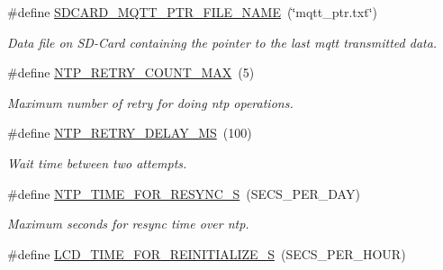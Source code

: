 \begin{DoxyCompactItemize}
\mbox{\label{rmap-config_8h_a7470ca0f869e88a49d4d70bad5de69e6}} 
\#define \hyperlink{rmap-config_8h_a7470ca0f869e88a49d4d70bad5de69e6}{S\+D\+C\+A\+R\+D\+\_\+\+M\+Q\+T\+T\+\_\+\+P\+T\+R\+\_\+\+F\+I\+L\+E\+\_\+\+N\+A\+ME}~(\char`\"{}mqtt\+\_\+ptr.\+txt\char`\"{})
\begin{DoxyCompactList}\small\item\em Data file on S\+D-\/\+Card containing the pointer to the last mqtt transmitted data. \end{DoxyCompactList}\item 
\mbox{\label{rmap-config_8h_a5042473c874b6f184bd4dc197feadca9}} 
\#define \hyperlink{rmap-config_8h_a5042473c874b6f184bd4dc197feadca9}{N\+T\+P\+\_\+\+R\+E\+T\+R\+Y\+\_\+\+C\+O\+U\+N\+T\+\_\+\+M\+AX}~(5)
\begin{DoxyCompactList}\small\item\em Maximum number of retry for doing ntp operations. \end{DoxyCompactList}\item 
\mbox{\label{rmap-config_8h_aee0934e91270bda3cc3fcaa9082fadc8}} 
\#define \hyperlink{rmap-config_8h_aee0934e91270bda3cc3fcaa9082fadc8}{N\+T\+P\+\_\+\+R\+E\+T\+R\+Y\+\_\+\+D\+E\+L\+A\+Y\+\_\+\+MS}~(100)
\begin{DoxyCompactList}\small\item\em Wait time between two attempts. \end{DoxyCompactList}\item 
\mbox{\label{rmap-config_8h_ac26c9e27fc41a5f7c43968b47b2d8cfc}} 
\#define \hyperlink{rmap-config_8h_ac26c9e27fc41a5f7c43968b47b2d8cfc}{N\+T\+P\+\_\+\+T\+I\+M\+E\+\_\+\+F\+O\+R\+\_\+\+R\+E\+S\+Y\+N\+C\+\_\+S}~(S\+E\+C\+S\+\_\+\+P\+E\+R\+\_\+\+D\+AY)
\begin{DoxyCompactList}\small\item\em Maximum seconds for resync time over ntp. \end{DoxyCompactList}\item 
\mbox{\label{rmap-config_8h_af546d356bff5c682bba4aeeed199d5df}} 
\#define \hyperlink{rmap-config_8h_af546d356bff5c682bba4aeeed199d5df}{L\+C\+D\+\_\+\+T\+I\+M\+E\+\_\+\+F\+O\+R\+\_\+\+R\+E\+I\+N\+I\+T\+I\+A\+L\+I\+Z\+E\+\_\+S}~(S\+E\+C\+S\+\_\+\+P\+E\+R\+\_\+\+H\+O\+UR)

\end{DoxyCompactItemize}
